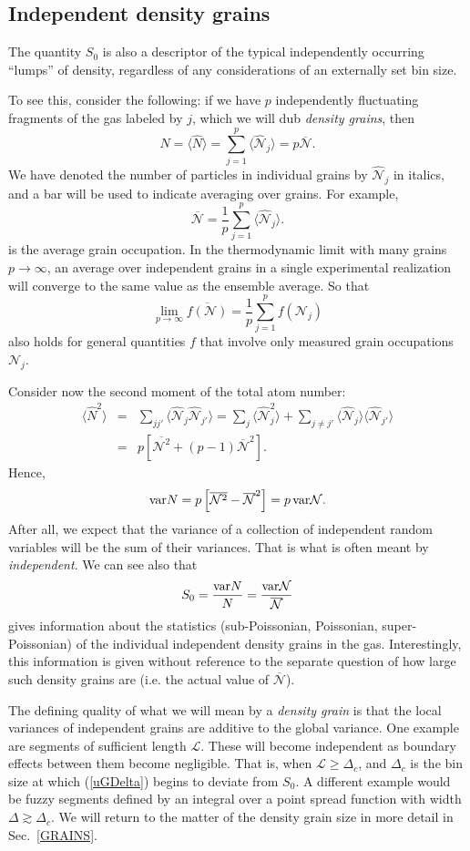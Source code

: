 \documentclass[aps,twocolumn,pra,superscriptaddress,nofootinbib,amsmath,amssymb,floats,floatfix,english]{revtex4-1}
\newcommand{\op}[1]{\widehat{#1}}
\newcommand{\mc}[1]{{\mathcal{#1}}}
\newcommand{\wb}[1]{{\overline{#1}}}
\newcommand{\nonu}{\nonumber}
\newcommand{\eqn}[1]{(\ref{#1})}
\renewcommand{\eq}[2]{\begin{equation}\label{#1}#2\end{equation}}
\newcommand{\eqa}[2]{\begin{eqnarray}#2\label{#1}\end{eqnarray}}
\begin{document}
\subsection{Independent density grains}
\label{DGRAINS}
The quantity $S_0$ is also a descriptor of the typical independently occurring ``lumps'' of density, regardless of any considerations of an externally set bin size.

To see this, consider the following: if we have $p$ independently fluctuating fragments of the gas labeled by $j$, which we will dub \emph{density grains},  then
\eq{N=}{
N=\langle\op{N}\rangle=\sum_{j=1}^{p} \langle\op{\mc{N}}_j\rangle = p\wb{\mc{N}}.
}
We have denoted the number of particles in individual grains by $\op{\mc{N}}_j$ in italics, and a bar will be used to indicate averaging over grains. For example,
\eq{mcNbar1}{
\wb{\mc{N}} = \frac{1}{p}\sum_{j=1}^p\langle\op{\mc{N}}_j\rangle.
}
is the average grain occupation.  
In the thermodynamic limit with many grains $p\to\infty$, an average over independent grains in a single experimental realization will converge to the same value as the ensemble average. So that
\eq{mcNbar}{
\lim_{p\to\infty}\wb{f(\mc{N})} = \frac{1}{p}\sum_{j=1}^pf\left(\mc{N}_j\right)
}
also holds for general quantities $f$ that involve only measured grain occupations $\mc{N}_j$.

Consider now the second moment of the total atom number:
\eqa{N2mc}{
\langle \op{N}^2\rangle  &=& \sum_{jj'}\langle\op{\mc{N}}_j\op{\mc{N}}_{j'}\rangle = \sum_j\langle\op{\mc{N}}_j^2\rangle + \sum_{j\neq j'}\langle\op{\mc{N}}_j\rangle\langle\op{\mc{N}}_{j'}\rangle \nonu\\
&=& p \left[\wb{\mc{N}^2} + (p-1)\wb{\mc{N}}^2\right].
}
Hence, 
\eq{N2mc2}{
{\rm var} N = p\left[\wb{\mc{N}^2} -\wb{\mc{N}}^2\right] = p\,{\rm var}\mc{N}.
}
After all, we expect that the variance of a collection of independent random variables will be  the sum of their variances. That is what is often meant by \emph{independent}.
We can see also that
\eq{N2mc3}{
S_0 = \frac{{\rm var}N}{N} = \frac{{\rm var}\mc{N}}{\wb{\mc{N}}}
}
gives information about the statistics (sub-Poissonian, Poissonian, super-Poissonian) of the individual independent density grains in the gas. 
Interestingly, this information is given without reference to the separate  question of how large such density grains are (i.e. the actual value of $\wb{\mc{N}}$).  

The defining quality of what we will mean by a \emph{density grain} is that the local variances of independent grains are additive to the global variance.
One example are segments of sufficient length $\mc{L}$. These will become independent as boundary effects between them become negligible. That is, when $\mc{L}\ge\Delta_c$, and $\Delta_c$ is the bin size at which \eqn{uGDelta} begins to deviate from $S_0$. A different example would be fuzzy segments defined by an integral over a point spread function with width $\Delta\gtrsim\Delta_c$.
We will return to the matter of the density grain size in more detail in Sec.~\ref{GRAINS}.
\end{document}
